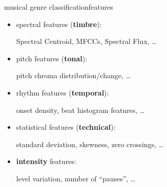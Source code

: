         \begin{frame}{musical genre classification}{features}
            \begin{itemize}
                \item	spectral features (\textbf{timbre}):
                
                    \pause
                    Spectral Centroid, MFCCs, Spectral Flux, \ldots
                \pause
                \item	pitch features (\textbf{tonal}):
                
                    \pause
                    pitch chroma distribution/change, \ldots
                \pause
                \item	rhythm features (\textbf{temporal}):
                
                    \pause
                    onset density, beat histogram features, \ldots
                \pause
                \item	statistical features (\textbf{technical}):
                
                    \pause
                    standard deviation, skewness, zero crossings, \ldots
                \pause
                \item	\textbf{intensity} features:
                
                    \pause
                    level variation, number of ``pauses'', \ldots
            \end{itemize}	
        \end{frame}

